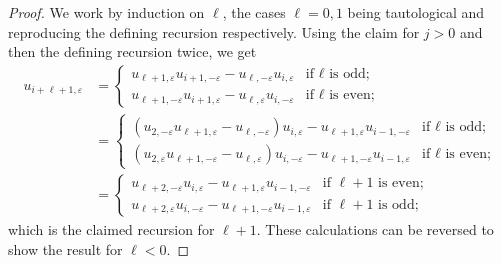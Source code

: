 \documentclass{amsart}
\numberwithin{theorem}{section}
\begin{document}
  \begin{proof}
    We work by induction on $\ell$, the cases $\ell=0,1$ being tautological and reproducing the defining recursion respectively.
    Using the claim for $j>0$ and then the defining recursion twice, we get
    \begin{align*}
      u_{i+\ell+1,\varepsilon}&=\begin{cases} u_{\ell+1,\varepsilon}u_{i+1,-\varepsilon}-u_{\ell,-\varepsilon}u_{i,\varepsilon} & \text{if $\ell$ is odd;}\\ u_{\ell+1,-\varepsilon}u_{i+1,\varepsilon}-u_{\ell,\varepsilon}u_{i,-\varepsilon} & \text{if $\ell$ is even;} \end{cases}\\
      &=\begin{cases} (u_{2,-\varepsilon}u_{\ell+1,\varepsilon}-u_{\ell,-\varepsilon})u_{i,\varepsilon}-u_{\ell+1,\varepsilon}u_{i-1,-\varepsilon} & \text{if $\ell$ is odd;}\\ (u_{2,\varepsilon}u_{\ell+1,-\varepsilon}-u_{\ell,\varepsilon})u_{i,-\varepsilon}-u_{\ell+1,-\varepsilon}u_{i-1,\varepsilon} & \text{if $\ell$ is even;} \end{cases}\\
      &=\begin{cases} u_{\ell+2,-\varepsilon}u_{i,\varepsilon}-u_{\ell+1,\varepsilon}u_{i-1,-\varepsilon} & \text{if $\ell+1$ is even;}\\ u_{\ell+2,\varepsilon}u_{i,-\varepsilon}-u_{\ell+1,-\varepsilon}u_{i-1,\varepsilon} & \text{if $\ell+1$ is odd;} \end{cases}
    \end{align*}
    which is the claimed recursion for $\ell+1$.
    These calculations can be reversed to show the result for $\ell<0$.
  \end{proof}
\end{document}
